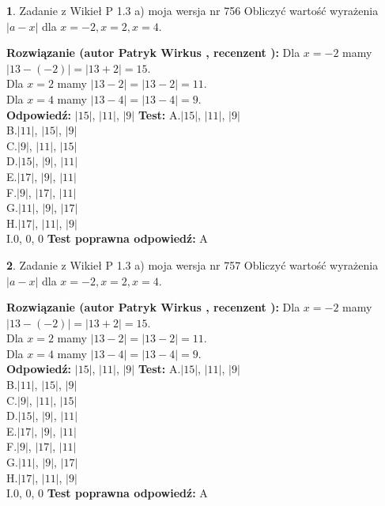 \documentclass[12pt, a4paper]{article}
\theoremstyle{definition} %
\newtheorem{zad}{}
\newcommand{\zadStart}[1]{\begin{zad}#1\newline}
\newcommand{\zadStop}{\end{zad}}
\newcommand{\rozwStart}[2]{\noindent \textbf{Rozwiązanie (autor #1 , recenzent #2): }\newline}
\newcommand{\rozwStop}{\newline}
\newcommand{\odpStart}{\noindent \textbf{Odpowiedź:}\newline}
\newcommand{\odpStop}{\newline}
\newcommand{\testStart}{\noindent \textbf{Test:}\newline}
\newcommand{\testStop}{\newline}
\newcommand{\kluczStart}{\noindent \textbf{Test poprawna odpowiedź:}\newline}
\newcommand{\kluczStop}{\newline}
\begin{document}
\zadStart{Zadanie z Wikieł P 1.3 a) moja wersja nr 756}
Obliczyć wartość wyrażenia $|a - x|$ dla $x=-2,x=2,x=4$.
\zadStop
\rozwStart{Patryk Wirkus}{}
Dla $x = -2$ mamy $|13 - (-2)| = |13 + 2| = 15$.\\
Dla $x = 2$ mamy $|13 - 2| = |13 - 2| = 11$.\\
Dla $x = 4$ mamy $|13 - 4| = |13 - 4| = 9$.\\
\rozwStop
\odpStart
$|15|$, $|11|$, $|9|$
\odpStop
\testStart
A.$|15|$, $|11|$, $|9|$\\
B.$|11|$, $|15|$, $|9|$\\
C.$|9|$, $|11|$, $|15|$\\
D.$|15|$, $|9|$, $|11|$\\
E.$|17|$, $|9|$, $|11|$\\
F.$|9|$, $|17|$, $|11|$\\
G.$|11|$, $|9|$, $|17|$\\
H.$|17|$, $|11|$, $|9|$\\
I.$0$, $0$, $0$
\testStop
\kluczStart
A
\kluczStop



\zadStart{Zadanie z Wikieł P 1.3 a) moja wersja nr 757}
Obliczyć wartość wyrażenia $|a - x|$ dla $x=-2,x=2,x=4$.
\zadStop
\rozwStart{Patryk Wirkus}{}
Dla $x = -2$ mamy $|13 - (-2)| = |13 + 2| = 15$.\\
Dla $x = 2$ mamy $|13 - 2| = |13 - 2| = 11$.\\
Dla $x = 4$ mamy $|13 - 4| = |13 - 4| = 9$.\\
\rozwStop
\odpStart
$|15|$, $|11|$, $|9|$
\odpStop
\testStart
A.$|15|$, $|11|$, $|9|$\\
B.$|11|$, $|15|$, $|9|$\\
C.$|9|$, $|11|$, $|15|$\\
D.$|15|$, $|9|$, $|11|$\\
E.$|17|$, $|9|$, $|11|$\\
F.$|9|$, $|17|$, $|11|$\\
G.$|11|$, $|9|$, $|17|$\\
H.$|17|$, $|11|$, $|9|$\\
I.$0$, $0$, $0$
\testStop
\kluczStart
A
\kluczStop
\end{document}
